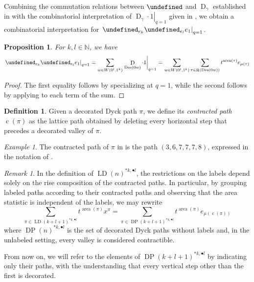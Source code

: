 \documentclass[reqno]{amsart}
\theoremstyle{plain}
\newtheorem{proposition}[theorem]{Proposition}
\theoremstyle{definition}
\newtheorem{definition}[theorem]{Definition}
\theoremstyle{remark}
\newtheorem{remark}[theorem]{Remark}
\newtheorem{example}[theorem]{Example}
\DeclareMathOperator{\D}{D}
\DeclareMathOperator{\LD}{LD}
\DeclareMathOperator{\R}{R}
\DeclareMathOperator{\DP}{DP}
\DeclareMathOperator{\area}{area}
\DeclareMathOperator{\Des}{Des}
\DeclareMathOperator{\cc}{c}
\let\oldTheta\Theta
\let\Theta\undefined
\DeclareMathOperator{\Theta}{\oldTheta}
\newcommand{\<}{\langle}
\renewcommand{\>}{\rangle}
\begin{document}
Combining the commutation relations between $\Theta$ and $\D_\gamma$ established in  with the combinatorial interpretation of $\left.\D_\gamma\cdot 1\right\rvert_{q=1}$ given in , we obtain a combinatorial interpretation for $\left.\Theta_{e_k} \Theta_{e_l} e_1 \right\rvert_{q=1}$.

\begin{proposition}
    For $k,l \in \mathbb{N}$, we have
    \[ 
        \left.\Theta_{e_k} \Theta_{e_l} e_1 \right\rvert_{q=1} 
        = \sum_{w\in W\left(0^l,1^k\right)} \left. \D_{\Des(0w)}\cdot 1\right\rvert_{q=1}=\sum_{w\in W\left(0^l,1^k\right)}\sum_{\tau\in \R(\Des(0w))}t^{\area(\tau)}e_{\mu(\tau)}
    \]
\end{proposition}

\begin{proof}
    The first equality follows by specializing  at $q=1$, while the second follows by applying  to each term of the sum.
\end{proof}

\begin{definition}
    Given a decorated Dyck path $\pi$, we define its \emph{contracted path $\cc(\pi)$} as the lattice path obtained by deleting every horizontal step that precedes a decorated valley of $\pi$. 
\end{definition}

\begin{example}
    The contracted path of $\pi$ in  is the path $(3,6,7,7,7,8)$, expressed in the notation of .
\end{example}

\begin{remark}
    In the definition of $\LD(n)^{\ast k, \bullet l}$, the restrictions on the labels depend solely on the rise composition of the contracted paths. In particular, by grouping labeled paths according to their contracted paths and observing that the area statistic is independent of the labels, we may rewrite
    \[
        \sum_{\pi \in \LD(k+l+1)^{\ast k, \bullet l}} t^{\area(\pi)} x^\pi
        = \sum_{\pi \in \DP(k+l+1)^{\ast k, \bullet l}} t^{\area(\pi)} e_{\mu(\cc(\pi))}
    \]
    where $\DP(n)^{\ast k, \bullet l}$ is the set of decorated Dyck paths without labels and, in the unlabeled setting, every valley is considered contractible.
\end{remark}

From now on, we will refer to the elements of $\DP(k+l+1)^{\ast k, \bullet l}$ by indicating only their paths, with the understanding that every vertical step other than the first is decorated.
\end{document}
